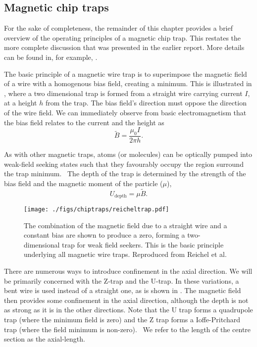 \subsection*{Magnetic chip traps}

For the sake of completeness, the remainder of this chapter provides a brief
overview of the operating principles of a magnetic chip trap. This restates the
more complete discussion that was presented in the earlier report. More details
can be found in, for example, .

The basic principle of a magnetic wire trap is to superimpose the magnetic
field of a wire with a homogenous bias field, creating a minimum. This is
illustrated in , where a two dimensional
trap is formed from a straight wire carrying current $I$, at a height $h$ from
the trap. 
The bias field's direction must oppose the
direction of the wire field. We can immediately observe from basic
electromagnetism that the bias field relates to the current and the height
as~\cite{Reichel1999}
%
\begin{equation}
  \tilde{B} = \frac{\mu_0 I}{2\pi h}.
  \label{into:eq:trapbias}
\end{equation}

As with other magnetic traps, atoms (or molecules) can be optically pumped into
weak-field seeking states such that they favourably occupy the region surround
the trap minimum.~\cite{Metcalf1999} The depth of the trap is determined by the
strength of the bias field and the magnetic moment of the particle ($\mu$),
%
\begin{equation}
  U_\text{depth} = \mu \tilde{B}. 
  \label{intro:eq:trapdepth}
\end{equation}

\begin{figure}
  \centering
  \texttt{[image: ./figs/chiptraps/reicheltrap.pdf]}
  \caption{The combination of the magnetic field due to a straight wire and a
  constant bias are shown to produce a zero, forming a two-dimensional trap for
  weak field seekers. This is the basic principle underlying all magnetic wire
  traps. Reproduced from Reichel et al.~\cite{Reichel1999}
  }
  \label{intro:fig:reicheltrap}
\end{figure}

There are numerous ways to introduce confinement in the axial direction. We
will be primarily concerned with the Z-trap and the U-trap. In these variations,
a bent wire is used instead of a straight one, as is shown in
. The magnetic field then provides some confinement in the
axial direction, although the depth is not as strong as it is in the other
directions. Note that the U trap forms a quadrupole trap (where the minimum
field is zero) and the Z trap forms a Ioffe-Pritchard trap (where the field
minimum is non-zero).~\cite{} We refer to the length of the centre section as
the axial-length.

